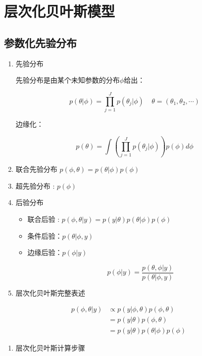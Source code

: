\section{层次化贝叶斯模型}

\subsection{参数化先验分布}
\begin{enumerate}
\def\labelenumi{\arabic{enumi}.}
\item
  先验分布\cite{gelman_bayesian_2014}

  先验分布是由某个未知参数的分布\(\phi\)给出：

  \[p(\theta|\phi)=\prod_{j=1}^Jp(\theta_j|\phi)\ \ \ \ \  \theta=(\theta_1,\theta_2,\cdots)\]

  边缘化：

  \[p(\theta)=\int\left( \prod_{j=1}^Jp(\theta_j|\phi) \right)p(\phi)d\phi\]
\item
  联合先验分布 \(p(\phi,\theta)=p(\theta|\phi)p(\phi)\)
\item
  超先验分布 : \(p(\phi)\)
\item
  后验分布

  \begin{itemize}
  \item
    联合后验 : \(p(\phi,\theta|y)=p(y|\theta)p(\theta|\phi)p(\phi)\)
  \item
    条件后验：\(p(\theta|\phi,y)\)
  \item
    边缘后验：\(p(\phi|y)\)

    \[p(\phi|y)=\frac{p(\theta,\phi|y)}{p(\theta|\phi,y)}\]
  \end{itemize}
\item
  层次化贝叶斯完整表述
\end{enumerate}

\begin{equation}
  \begin{aligned}
    p(\phi,\theta|y)
    &\propto p(y|\phi,\theta)p(\phi,\theta)\\
    &=p(y|\theta)p(\phi,\theta)\\
    &=p(y|\theta)p(\theta|\phi)p(\phi)
    \end{aligned}
\end{equation}


\begin{enumerate}
\def\labelenumi{\arabic{enumi}.}
\item
  层次化贝叶斯计算步骤
\end{enumerate}

